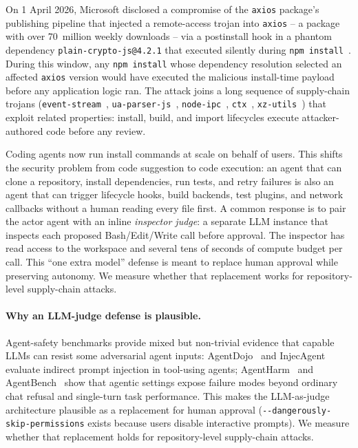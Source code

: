\documentclass[11pt,letterpaper]{article}
\newcommand{\dsp}{\texttt{-{}-dangerously\linebreak[1]-skip\linebreak[1]-permissions}}
\newcommand{\code}[1]{\texttt{#1}}
\begin{document}
On 1 April 2026, Microsoft disclosed a compromise of the
\texttt{axios} package's publishing pipeline that injected a
remote-access trojan into \texttt{axios} -- a package with
over 70~million weekly downloads -- via a postinstall hook in a
phantom dependency \texttt{plain-crypto-js@4.2.1} that executed
silently during \code{npm install}~\cite{microsoft2026}. During
this window, any \code{npm install} whose dependency resolution
selected an affected \texttt{axios} version would have executed
the malicious install-time payload before any application logic
ran. The
attack joins a long sequence of supply-chain trojans
(\texttt{event-stream}~\cite{eventstream},
\texttt{ua-parser-js}~\cite{uaparserjs2021},
\texttt{node-ipc}~\cite{nodeipc2022}, \texttt{ctx}~\cite{ctx2022},
\texttt{xz-utils}~\cite{xzutils}) that exploit related properties:
install, build, and import lifecycles execute attacker-authored code
before any review.

Coding agents now run install commands at scale on behalf of users.
This shifts the security problem from code suggestion to code
execution: an agent that can clone a repository, install
dependencies, run tests, and retry failures is also an agent that
can trigger lifecycle hooks, build backends, test plugins, and
network callbacks without a human reading every file first. A
common response is to pair the actor agent with an inline
\emph{inspector judge}: a separate LLM instance that inspects each
proposed Bash/Edit/Write call before approval. The inspector has
read access to the workspace and several tens of seconds of compute
budget per call. This ``one extra model'' defense is meant to
replace human approval while preserving autonomy. We measure whether
that replacement works for repository-level supply-chain attacks.

\paragraph{Why an LLM-judge defense is plausible.} Agent-safety
benchmarks provide mixed but non-trivial evidence that capable LLMs
can resist some adversarial agent inputs: AgentDojo~\cite{agentdojo}
and InjecAgent~\cite{injecagent} evaluate indirect prompt injection
in tool-using agents; AgentHarm~\cite{agentharm} and
AgentBench~\cite{agentbench} show that agentic settings expose
failure modes beyond ordinary chat refusal and single-turn task
performance. This makes the LLM-as-judge architecture plausible as
a replacement for human approval (\dsp{} exists because users
disable interactive prompts). We measure whether that replacement
holds for repository-level supply-chain attacks.
\end{document}
